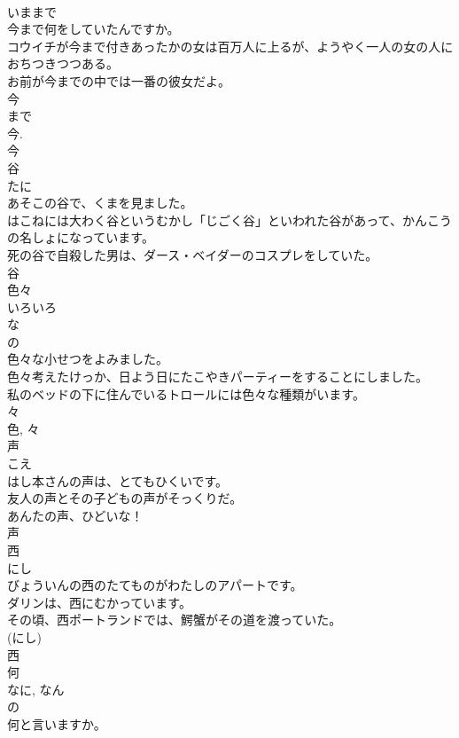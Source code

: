 \documentclass[8pt]{extreport}
\begin{document}
\begin{CJK}{UTF8}{min}
\\	いままで	
\\	今まで何をしていたんですか。	
\\	コウイチが今まで付きあったかの女は百万人に上るが、ようやく一人の女の人におちつきつつある。	
\\	お前が今までの中では一番の彼女だよ。	
\\	今 
\\	まで 
\\	今. 
\\	今	
\\	谷	
\\	たに	
\\	あそこの谷で、くまを見ました。	
\\	はこねには大わく谷というむかし「じごく谷」といわれた谷があって、かんこうの名しょになっています。	
\\	死の谷で自殺した男は、ダース・ベイダーのコスプレをしていた。	
\\	谷	
\\	色々	
\\	いろいろ	
\\	な 
\\	の 
\\	色々な小せつをよみました。	
\\	色々考えたけっか、日よう日にたこやきパーティーをすることにしました。	
\\	私のベッドの下に住んでいるトロールには色々な種類がいます。	
\\	々 
\\	色, 々	
\\	声	
\\	こえ	
\\	はし本さんの声は、とてもひくいです。	
\\	友人の声とその子どもの声がそっくりだ。	
\\	あんたの声、ひどいな！	
\\	声	
\\	西	
\\	にし	
\\	びょういんの西のたてものがわたしのアパートです。	
\\	ダリンは、西にむかっています。	
\\	その頃、西ポートランドでは、鰐蟹がその道を渡っていた。	
\\	(にし) 
\\	西	
\\	何	
\\	なに, なん	
\\	の 
\\	何と言いますか。	

\end{CJK}
\end{document}
